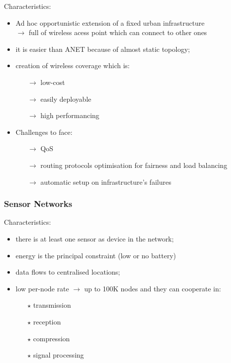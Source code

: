 Characteristics:
\begin{itemize}
    \item Ad hoc opportunistic extension of a fixed urban infrastructure\\
    $\rightarrow$ full of wireless acess point which can connect to other
    ones
    \item it is easier than ANET because of almost static topology;
    \item creation of wireless coverage which is:
    \begin{itemize}
        \item[$\rightarrow$] low-cost
        \item[$\rightarrow$] easily deployable
        \item[$\rightarrow$] high performancing
    \end{itemize}
    \item Challenges to face:
    \begin{itemize}
        \item[$\rightarrow$] QoS
        \item[$\rightarrow$] routing protocols optimisation for fairness and load balancing
        \item[$\rightarrow$] automatic setup on infrastructure's failures
    \end{itemize}
\end{itemize}

\subsubsection{Sensor Networks}

Characteristics:
\begin{itemize}
    \item there is at least one sensor as device in the network;
    \item energy is the principal constraint (low or no battery)
    \item data flows to centralised locations;
    \item low per-node rate $\rightarrow$ up to 100K nodes
    and they can cooperate in:
    \begin{itemize}
        \item[$\star$] transmission
        \item[$\star$] reception
        \item[$\star$] compression
        \item[$\star$] signal processing
    \end{itemize}
\end{itemize}

